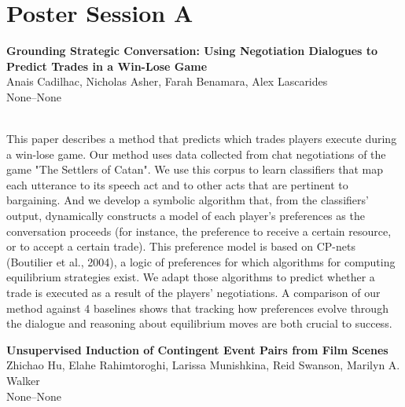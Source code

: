 \documentclass[twoside,makeidx]{book}
\begin{document}
\section{Poster Session A}
\vspace{-1em}
\par\vspace{2em}\noindent%
\begin{minipage}{\linewidth}%
\begin{center}
\textbf{\normalsize Grounding Strategic Conversation: Using Negotiation Dialogues to Predict Trades in a Win-Lose Game}\\
\normalsize  Anais Cadilhac,  Nicholas Asher,  Farah Benamara,  Alex Lascarides\\
{\small None--None}\\
\end{center}
\end{minipage}\\[0.5em]
\nopagebreak%
\noindent%
{\small This paper describes a method that predicts which trades players execute during a win-lose game. Our method uses data collected from chat negotiations of the game "The Settlers of Catan". We use this corpus to learn classifiers that map each utterance to its speech act and to other acts that are pertinent to bargaining. And we develop a symbolic algorithm that, from the classifiers' output, dynamically constructs a model of each player's preferences as the conversation proceeds (for instance, the preference to receive a certain resource, or to accept a certain trade). This preference model is based on CP-nets (Boutilier et al., 2004), a logic of preferences for which algorithms for computing equilibrium strategies exist. We adapt those algorithms to  predict whether a trade is executed as a result of the players' negotiations. A comparison of our method against 4 baselines shows that tracking how preferences evolve through the dialogue and reasoning about equilibrium moves are both crucial to success.}
\par\vspace{2em}\noindent%
\begin{minipage}{\linewidth}%
\begin{center}
\textbf{\normalsize Unsupervised Induction of Contingent Event Pairs from Film Scenes}\\
\normalsize  Zhichao Hu,  Elahe Rahimtoroghi,  Larissa Munishkina,  Reid Swanson,  Marilyn A. Walker\\
{\small None--None}\\
\end{center}
\end{minipage}\\[0.5em]
\end{document}

